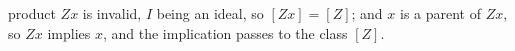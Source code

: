 product $Zx$ is invalid, $I$ being an ideal, so $[Zx] = [Z]$; and $x$ is a parent of $Zx$, so $Zx$ implies $x$, and the implication passes to the class $[Z]$.
